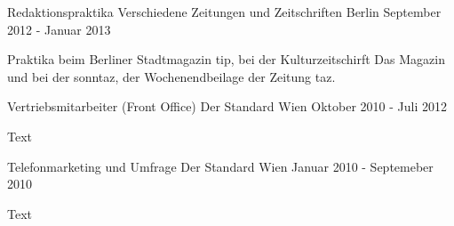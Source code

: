 \begin{cventries}
  \cventry
    {Redaktionspraktika} %
    {Verschiedene Zeitungen und Zeitschriften} %
    {Berlin} %
    {September 2012 - Januar 2013} %
    { 
      \begin{cvitems} %
        \item {Praktika beim Berliner Stadtmagazin tip, bei der Kulturzeitschirft Das Magazin und bei der sonntaz, der Wochenendbeilage der Zeitung taz.}
      \end{cvitems}
    }

  \cventry
    {Vertriebsmitarbeiter (Front Office)} %
    {Der Standard} %
    {Wien} %
    {Oktober 2010 - Juli 2012} %
    {
      \begin{cvitems} %
        \item {Text}
      \end{cvitems}
    }

\cventry
{Telefonmarketing und Umfrage} %
{Der Standard} %
{Wien} %
{Januar 2010 - Septemeber 2010} %
{
  \begin{cvitems} %
    \item {Text}
  \end{cvitems}
}

\end{cventries}
